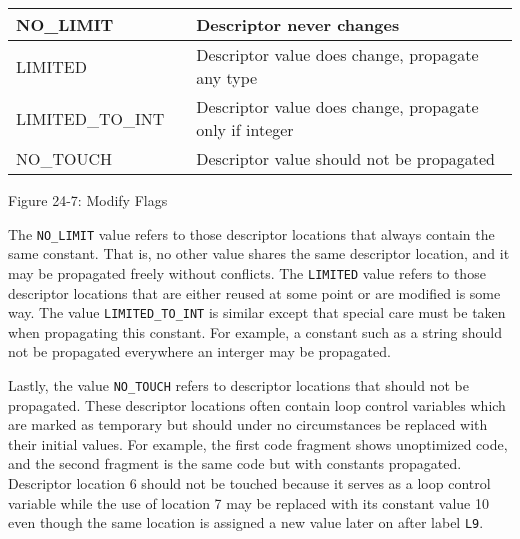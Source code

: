 \begin{center}
\tabletail{}
\tablelasttail{}
\begin{xtabular}{|m{1.4302598in}|m{0.41155985in}|m{3.7115598in}|}
\hline
{\ttfamily NO\_LIMIT} &
 &
 Descriptor never changes\\\hline
{\ttfamily LIMITED} &
 &
 Descriptor value does change, propagate any type\\\hline
{\ttfamily LIMITED\_TO\_INT} &
 &
 Descriptor value does change, propagate only if integer\\\hline
{\ttfamily NO\_TOUCH} &
 &
 Descriptor value should not be propagated\\\hline
\end{xtabular}
\end{center}
{\centering{}
Figure 24-7: Modify Flags
\par}


The \texttt{NO\_LIMIT} value refers to those descriptor locations that
always contain the same constant. That is, no other value shares the
same descriptor location, and it may be propagated freely without
conflicts. The \texttt{LIMITED} value refers to those descriptor
locations that are either reused at some point or are modified is some
way. The value \texttt{LIMITED\_TO\_INT} is similar except that
special care must be taken when propagating this constant. For
example, a constant such as a string should not be propagated
everywhere an interger may be propagated.

Lastly, the value \texttt{NO\_TOUCH} refers to descriptor locations
that should not be propagated. These descriptor locations often
contain loop control variables which are marked as temporary but
should under no circumstances be replaced with their initial
values. For example, the first code fragment shows unoptimized code,
and the second fragment is the same code but with constants
propagated. Descriptor location 6 should not be touched because it
serves as a loop control variable while the use of location 7 may be
replaced with its constant value 10 even though the same location is
assigned a new value later on after label \texttt{L9}.

